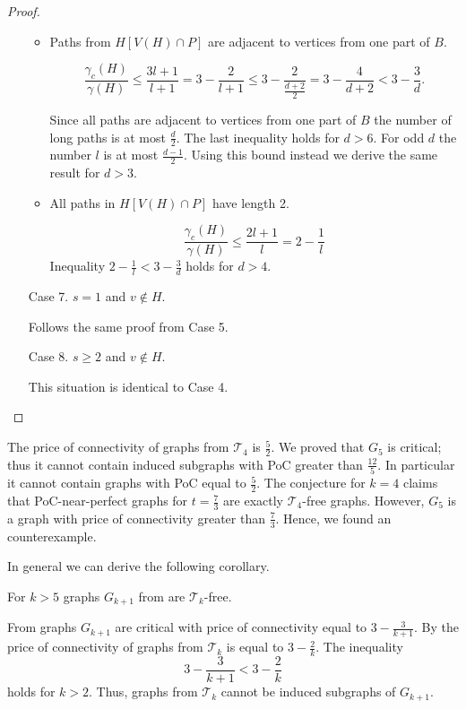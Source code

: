 \begin{proof}
\begin{enumerate}
\begin{itemize}
			\item Paths from \(H[V(H) \cap P]\) are adjacent to vertices from one part of \(B\).
				
			\[\frac{\gamma_c(H)}{\gamma(H)} \leq {\frac{3l + 1}{l + 1}} = 3 - \frac{2}{l + 1} 
			\leq {3 - \frac{2}{\frac{d + 2}{2}}} = 3 - \frac{4}{d + 2} < 3 - \frac{3}{d}.\]

			Since all paths are adjacent to vertices from one part of \(B\) the number of long paths is at most 
			\(\frac{d}{2}\).
			The last inequality holds for \(d > 6\).
			For odd \(d\) the number \(l\) is at most \(\frac{d - 1}{2}\).
			Using this bound instead we derive the same result for \(d > 3\).

			\item All paths in \(H[V(H) \cap P]\) have length 2.

			\[\frac{\gamma_c(H)}{\gamma(H)} \leq {\frac{2l + 1}{l}} = 2 - \frac{1}{l}\]
			Inequality \(2 - \frac{1}{l} < 3 - \frac{3}{d}\) holds for \(d > 4\).
		\end{itemize}
	
	\item [Case 7.]\(s = 1\) and \(v \not\in H\).
		
		Follows the same proof from Case 5.

	\item [Case 8.] \(s \geq 2\) and \(v \not\in H\).
		
		This situation is identical to Case 4.
\end{enumerate}
\end{proof}
The price of connectivity of graphs from \(\mathcal{T}_4\) is \(\frac{5}{2}\).
We proved that \(G_5\) is critical; thus it cannot contain
induced subgraphs with PoC greater than \(\frac{12}{5}\). In particular it cannot contain graphs with PoC equal to \(\frac{5}{2}\).
The conjecture for \(k=4\) claims that PoC-near-perfect graphs for \(t=\frac{7}{3}\) are exactly \(\mathcal{T}_4\)-free graphs.
However, \(G_5\) is a graph with price of connectivity greater than \(\frac{7}{3}\).
Hence, we found an counterexample.

In general we can derive the following corollary.
\begin{cor}
	For \(k > 5\) graphs \(G_{k + 1}\) from  are \(\mathcal{T}_{k}\)-free.
\end{cor}
\begin{myproof}
	From  graphs \(G_{k + 1}\) are critical with price of connectivity equal to \(3 - \frac{3}{k+1}\).
	By  the price of connectivity of graphs from \(\mathcal{T}_{k}\) is equal to \(3 - \frac{2}{k}\).
	The inequality \[{3 - \frac{3}{k+1}} < {3 - \frac{2}{k}}\]
	holds for \(k > 2\). 
	Thus, graphs from \(\mathcal{T}_{k}\) cannot be induced subgraphs of \(G_{k + 1}\).
\end{myproof}

